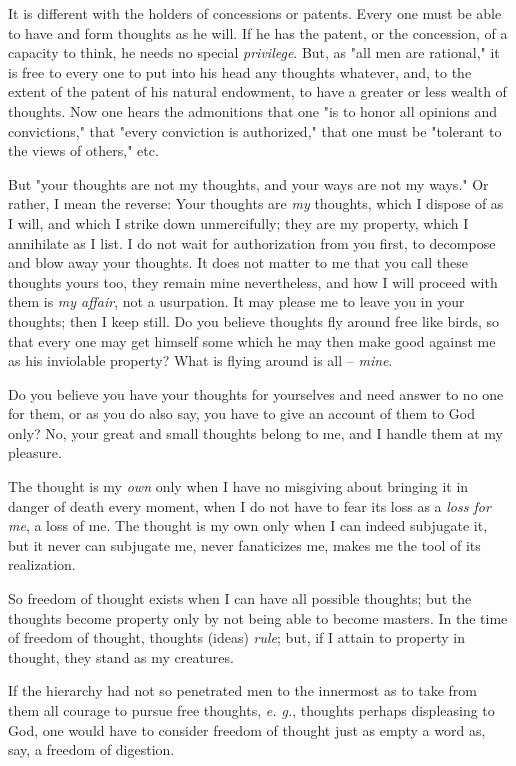 It is different with the holders of concessions or patents. Every one must be 
able to have and form thoughts as he will. If he has the patent, or the 
concession, of a capacity to think, he needs no special \textit{privilege}. 
But, as "{}all men are rational,"{} it is free to every one to put into his 
head any thoughts whatever, and, to the extent of the patent of his natural 
endowment, to have a greater or less wealth of thoughts. Now one hears the 
admonitions that one "{}is to honor all opinions and convictions,"{} that 
"{}every conviction is authorized,"{} that one must be "{}tolerant to the 
views of others,"{} etc.

But "{}your thoughts are not my thoughts, and your ways are not my ways."{} Or 
rather, I mean the reverse: Your thoughts are \textit{my} thoughts, which I 
dispose of as I will, and which I strike down unmercifully; they are my 
property, which I annihilate as I list. I do not wait for authorization from 
you first, to decompose and blow away your thoughts. It does not matter to me 
that you call these thoughts yours too, they remain mine nevertheless, and how 
I will proceed with them is \textit{my affair}, not a usurpation. It may 
please me to leave you in your thoughts; then I keep still. Do you believe 
thoughts fly around free like birds, so that every one may get himself some 
which he may then make good against me as his inviolable property? What is 
flying around is all -- \textit{mine}.

Do you believe you have your thoughts for yourselves and need answer to no one 
for them, or as you do also say, you have to give an account of them to God 
only? No, your great and small thoughts belong to me, and I handle them at my 
pleasure.

The thought is my \textit{own} only when I have no misgiving about bringing it 
in danger of death every moment, when I do not have to fear its loss as a 
\textit{loss for me}, a loss of me. The thought is my own only when I can 
indeed subjugate it, but it never can subjugate me, never fanaticizes me, 
makes me the tool of its realization.

So freedom of thought exists when I can have all possible thoughts; but the 
thoughts become property only by not being able to become masters. In the time 
of freedom of thought, thoughts (ideas) \textit{rule}; but, if I attain to 
property in thought, they stand as my creatures.

If the hierarchy had not so penetrated men to the innermost as to take from 
them all courage to pursue free thoughts, \textit{e. g.}, thoughts perhaps 
displeasing to God, one would have to consider freedom of thought just as 
empty a word as, say, a freedom of digestion.

